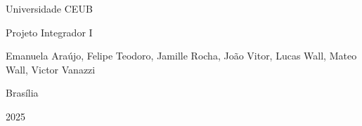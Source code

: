 
\begin{titlepage}
    \centering
    \vspace*{5cm}
    {\Large Universidade CEUB \par}
    {\large Projeto Integrador I \par}
    \vfill
    {\large Emanuela Araújo, Felipe Teodoro, Jamille Rocha, João Vitor, Lucas Wall, Mateo Wall, Victor Vanazzi  \par}
    {\large Brasília \par}
    {\large 2025 \par}
\end{titlepage}
